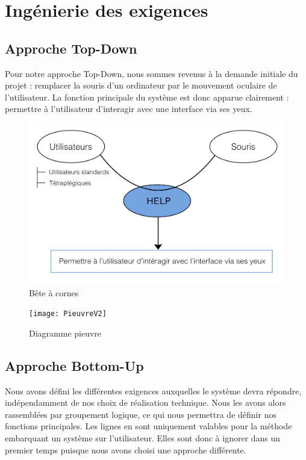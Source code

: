 \chapter{Ingénierie des exigences}
\section{Approche Top-Down}
\label{sec:top-down}

Pour notre approche Top-Down, nous sommes revenus à la demande initiale du projet : remplacer la souris d'un ordinateur par le mouvement oculaire de l'utilisateur. La fonction principale du système est donc apparue clairement : permettre à l'utilisateur d'interagir avec une interface via ses yeux. 

\begin{figure}[h]
  \centering
  \includegraphics[scale=1]{BeteACornes}
  \caption{Bête à cornes}
  \label{fig:bac}
\end{figure}

\begin{figure}[H]
  \centering
  \texttt{[image: PieuvreV2]}
  \caption{Diagramme pieuvre}
  \label{fig:pieuvre}
\end{figure}

\section{Approche Bottom-Up}
Nous avons défini les différentes exigences auxquelles le système devra répondre, indépendamment de nos choix de réalisation technique. Nous les avons alors rassemblées par groupement logique, ce qui nous permettra de définir nos fonctions principales. Les lignes en {\color{sable}{\rule{0.5cm}{0.25cm}}} sont uniquement valables pour la méthode embarquant un système sur l'utilisateur. Elles sont donc à ignorer dans un premier temps puisque nous avons choisi une approche différente. 

